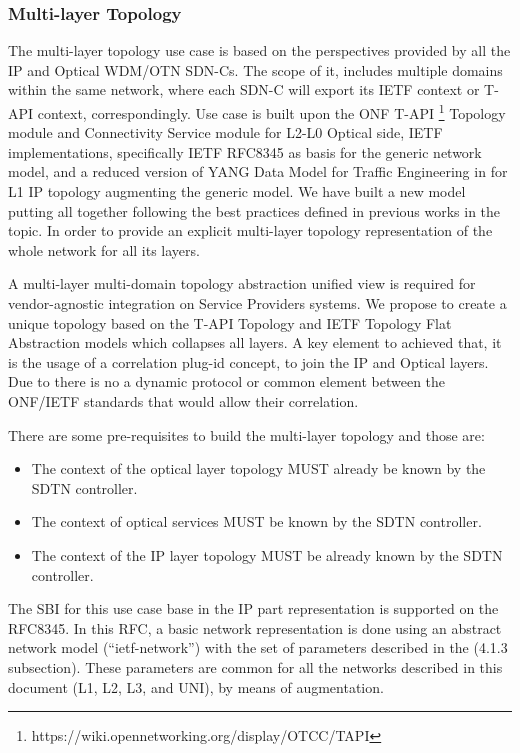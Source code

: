 \documentclass[a4paper,fleqn]{cas-dc}
\begin{document}
\subsubsection{Multi-layer Topology}
The multi-layer topology use case is based on the perspectives provided by all the IP and Optical WDM/OTN SDN-Cs. The scope of it, includes multiple domains within the same network, where each SDN-C will export its IETF context or T-API context, correspondingly. Use case is built upon the ONF T-API \footnote{https://wiki.opennetworking.org/display/OTCC/TAPI} Topology module and Connectivity Service module for L2-L0 Optical side, IETF implementations, specifically IETF RFC8345 \cite{rfc8345} as basis for the generic network model, and a reduced version of YANG Data Model for Traffic Engineering in \cite{ietf-teas-yang-te-topo-22} for L1 IP topology augmenting the generic model. We have built a new model putting all together following the best practices defined in previous works in the topic. In order to provide an explicit multi-layer topology representation of the whole network for all its layers. 

A multi-layer multi-domain topology abstraction unified view is required for vendor-agnostic integration on Service Providers systems. We propose to create a unique topology based on the T-API Topology and IETF Topology Flat Abstraction models which collapses all layers. A key element to achieved that, it is the usage of a correlation plug-id concept, to join the IP and Optical layers. Due to there is no a dynamic protocol or common element between the ONF/IETF standards that would allow their correlation. 

There are some pre-requisites to build the multi-layer topology and those are:
\begin{itemize}
    \item The context of the optical layer topology MUST already be known by the SDTN controller.
    \item The context of optical services MUST be known by the SDTN controller.
    \item The context of the IP layer topology MUST be already known by the SDTN controller.
\end{itemize}

The SBI for this use case base in the IP part representation is supported on the RFC8345. In this RFC, a basic network representation is done using an abstract network model (“ietf-network”) with the set of parameters described in the (4.1.3 subsection). These parameters are common for all the networks described in this document (L1, L2, L3, and UNI), by means of augmentation.  
\end{document}
